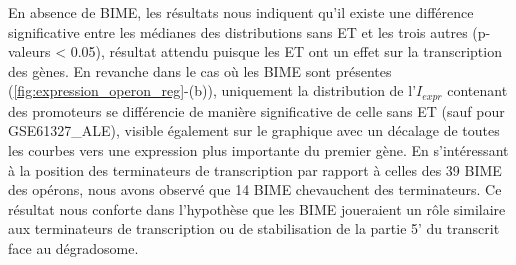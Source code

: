 \documentclass[12pt,a4paper]{report}
\begin{document}
\begin{onehalfspace}
\begin{figure}
\end{figure}

En absence de BIME, les résultats nous indiquent qu'il existe une différence significative entre les médianes des distributions sans ET et les trois autres (p-valeurs < 0.05), résultat attendu puisque les ET ont un effet sur la transcription des gènes. En revanche dans le cas où les BIME sont présentes (\autoref{fig:expression_operon_reg}-(b)), uniquement la distribution de l'$I_{expr}$ contenant des promoteurs se différencie de manière significative de celle sans ET (sauf pour GSE61327\_ALE), visible également sur le graphique avec un décalage de toutes les courbes vers une expression plus importante du premier gène. 
En s'intéressant à la position des terminateurs de transcription par rapport à celles des 39 BIME des opérons, nous avons observé que 14 BIME chevauchent des terminateurs. Ce résultat nous conforte dans l'hypothèse que les BIME joueraient un rôle similaire aux terminateurs de transcription ou de stabilisation de la partie 5' du transcrit face au dégradosome.


\end{onehalfspace}
\end{document}
